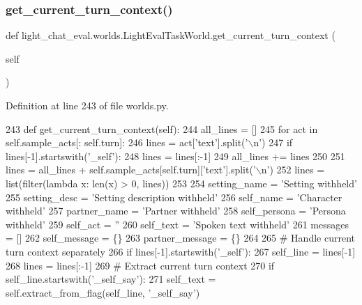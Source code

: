 \subsubsection{\texorpdfstring{get\+\_\+current\+\_\+turn\+\_\+context()}{get\_current\_turn\_context()}}
{\footnotesize\ttfamily def light\+\_\+chat\+\_\+eval.\+worlds.\+Light\+Eval\+Task\+World.\+get\+\_\+current\+\_\+turn\+\_\+context (\begin{DoxyParamCaption}\item[{}]{self }\end{DoxyParamCaption})}



Definition at line 243 of file worlds.\+py.


\begin{DoxyCode}
243     \textcolor{keyword}{def }get\_current\_turn\_context(self):
244         all\_lines = []
245         \textcolor{keywordflow}{for} act \textcolor{keywordflow}{in} self.sample\_acts[: self.turn]:
246             lines = act[\textcolor{stringliteral}{'text'}].split(\textcolor{stringliteral}{'\(\backslash\)n'})
247             \textcolor{keywordflow}{if} lines[-1].startswith(\textcolor{stringliteral}{'\_self'}):
248                 lines = lines[:-1]
249             all\_lines += lines
250 
251         lines = all\_lines + self.sample\_acts[self.turn][\textcolor{stringliteral}{'text'}].split(\textcolor{stringliteral}{'\(\backslash\)n'})
252         lines = list(filter(\textcolor{keyword}{lambda} x: len(x) > 0, lines))
253 
254         setting\_name = \textcolor{stringliteral}{'Setting withheld'}
255         setting\_desc = \textcolor{stringliteral}{'Setting description withheld'}
256         self\_name = \textcolor{stringliteral}{'Character withheld'}
257         partner\_name = \textcolor{stringliteral}{'Partner withheld'}
258         self\_persona = \textcolor{stringliteral}{'Persona withheld'}
259         self\_act = \textcolor{stringliteral}{''}
260         self\_text = \textcolor{stringliteral}{'Spoken text withheld'}
261         messages = []
262         self\_message = \{\}
263         partner\_message = \{\}
264 
265         \textcolor{comment}{# Handle current turn context separately}
266         \textcolor{keywordflow}{if} lines[-1].startswith(\textcolor{stringliteral}{'\_self'}):
267             self\_line = lines[-1]
268             lines = lines[:-1]
269             \textcolor{comment}{# Extract current turn context}
270             \textcolor{keywordflow}{if} self\_line.startswith(\textcolor{stringliteral}{'\_self\_say'}):
271                 self\_text = self.extract\_from\_flag(self\_line, \textcolor{stringliteral}{'\_self\_say'})

\end{DoxyCode}
